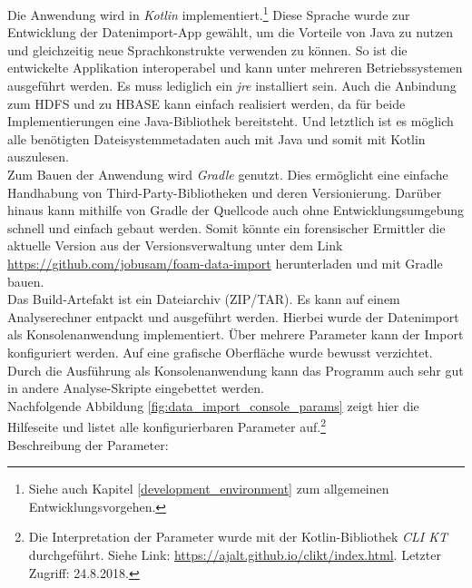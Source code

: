 \noindent
Die Anwendung wird in \textit{Kotlin} implementiert.\footnote{Siehe auch Kapitel \ref{development_environment} zum allgemeinen Entwicklungsvorgehen.} Diese Sprache wurde zur Entwicklung der Datenimport-App gewählt, um die Vorteile von Java zu nutzen und gleichzeitig neue Sprachkonstrukte verwenden zu können. So ist die entwickelte Applikation interoperabel und kann unter mehreren Betriebssystemen ausgeführt werden. Es muss lediglich ein \textit{\gls{jre}}  installiert sein. Auch die Anbindung zum HDFS und zu HBASE kann einfach realisiert werden, da für beide Implementierungen eine Java-Bibliothek bereitsteht. Und letztlich ist es möglich alle benötigten Dateisystemmetadaten auch mit Java und somit mit Kotlin auszulesen. \\
Zum Bauen der Anwendung wird \textit{Gradle} genutzt. Dies ermöglicht eine einfache Handhabung von Third-Party-Bibliotheken und deren Versionierung. Darüber hinaus kann mithilfe von Gradle der Quellcode auch ohne Entwicklungsumgebung schnell und einfach gebaut werden. Somit könnte ein forensischer Ermittler die aktuelle Version aus der Versionsverwaltung unter dem Link \url{https://github.com/jobusam/foam-data-import} herunterladen und mit Gradle bauen.\\
Das Build-Artefakt ist ein Dateiarchiv (ZIP/TAR). Es kann auf einem Analyserechner entpackt und ausgeführt werden. Hierbei wurde der Datenimport als Konsolenanwendung implementiert. Über mehrere Parameter kann der Import konfiguriert werden. Auf eine grafische Oberfläche wurde bewusst verzichtet. Durch die Ausführung als Konsolenanwendung kann das Programm auch sehr gut in andere Analyse-Skripte eingebettet werden.\\

\noindent
Nachfolgende Abbildung \ref{fig:data_import_console_params}  zeigt hier die Hilfeseite und listet alle konfigurierbaren Parameter auf.\footnote{Die Interpretation der Parameter wurde mit der Kotlin-Bibliothek \textit{CLI KT} durchgeführt. Siehe Link: \url{https://ajalt.github.io/clikt/index.html}. Letzter Zugriff: 24.8.2018.}\\
Beschreibung der Parameter:

